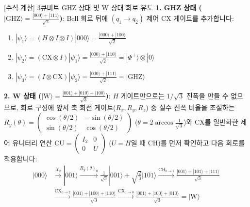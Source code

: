 \documentclass[11pt, a4paper]{article}
\newcommand{\ket}[1]{|#1\rangle}
\theoremstyle{definition}
\begin{document}
\begin{worksheetbox}{[수식 계산] 3큐비트 GHZ 상태 및 W 상태 회로 유도}
\textbf{1. GHZ 상태 ($\ket{\mathrm{GHZ}} = \frac{\ket{000}+\ket{111}}{\sqrt{2}}$)}: Bell 회로 뒤에 $(q_1 \to q_2)$ 제어 $\mathrm{CX}$ 게이트를 추가합니다:
\begin{enumerate}
    \item $\ket{\psi_1} = (H \otimes I \otimes I)\ket{000} = \frac{\ket{000} + \ket{100}}{\sqrt{2}}$
    \item $\ket{\psi_2} = (\mathrm{CX} \otimes I)\ket{\psi_1} = \frac{\ket{000} + \ket{110}}{\sqrt{2}} = \ket{\Phi^+} \otimes \ket{0}$
    \item $\ket{\psi_3} = (I \otimes \mathrm{CX})\ket{\psi_2} = \frac{\ket{000} + \ket{111}}{\sqrt{2}} = \ket{\mathrm{GHZ}}$
\end{enumerate}
\textbf{2. W 상태 ($\ket{\mathrm{W}} = \frac{\ket{001}+\ket{010}+\ket{100}}{\sqrt{3}}$)}: $H$ 게이트만으로는 $1/\sqrt{3}$ 진폭을 만들 수 없으므로, 회로 구성에 앞서 축 회전 게이트($R_x, R_y, R_z$) 중 실수 진폭 비율을 조절하는 $R_y(\theta) = \begin{pmatrix} \cos(\theta/2) & -\sin(\theta/2) \\ \sin(\theta/2) & \cos(\theta/2) \end{pmatrix}$ ($\theta = 2\arccos\frac{1}{\sqrt{3}}$)와 $\mathrm{CX}$를 일반화한 제어 유니터리 연산 $\mathrm{CU} = \begin{pmatrix} I_2 & 0 \\ 0 & U \end{pmatrix}$ ($U=H$일 때 $\mathrm{CH}$)를 먼저 확인하고 다음 회로를 적용합니다:
\begin{align*}
\ket{000} &\xrightarrow{X_2} \ket{001} \xrightarrow{R_y(\theta)_0} \frac{1}{\sqrt{3}}\ket{001} + \sqrt{\frac{2}{3}}\ket{101} \xrightarrow{\mathrm{CH}_{0\to 1}} \frac{\ket{001}+\ket{101}+\ket{111}}{\sqrt{3}} \\
&\xrightarrow{\mathrm{CX}_{0\to 2}} \frac{\ket{001}+\ket{100}+\ket{110}}{\sqrt{3}} \xrightarrow{\mathrm{CX}_{1\to 0}} \frac{\ket{001}+\ket{100}+\ket{010}}{\sqrt{3}} = \ket{\mathrm{W}}
\end{align*}
\end{worksheetbox}
\end{document}
